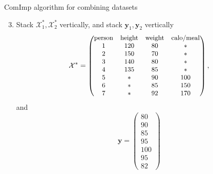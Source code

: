 \documentclass[xcolor={dvipsnames}]{beamer} %
\begin{document}
\begin{frame}{ComImp algorithm for combining datasets}
    \begin{enumerate}
    \setcounter{enumi}{2}
    \item Stack $\mathcal{X}_1^*, \mathcal{X}_2^*$ vertically, and stack $\mathbf{y}_1,  \mathbf{y}_2$ vertically
    \begin{equation*}
    \small
        \mathcal{X}^*= 
        \begin{pmatrix}
    \text{person} &\text{height} & \text{weight} & \text{calo/meal}\\
    1 & 120 & 80 & *\\
    2 & 150 & 70 & *\\
    3 & 140 & 80 & *\\
    4 & 135 & 85 & *\\
    5 & * & 90 & 100 \\
    6 & * & 85 & 150\\
    7 & * & 92 & 170
    \end{pmatrix},
\end{equation*}
and 
\begin{equation*}
    \mathbf{y}%
    = \begin{pmatrix}
        80\\ 90 \\ 85\\ 95\\
        100 \\ 95\\82
    \end{pmatrix}
\end{equation*}
\end{enumerate}
\end{frame}
\end{document}
